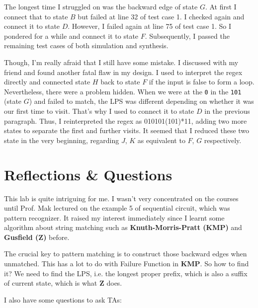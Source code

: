 \documentclass[12pt, a4paper]{article}
\begin{document}
The longest time I struggled on was the backward edge of state $G$. At first I connect that to state $B$ but failed at line 32 of test case 1. I checked again and connect it to state $D$. However, I failed again at line 75 of test case 1. So I pondered for a while and connect it to state $F$. Subsequently, I passed the remaining test cases of both simulation and synthesis.

Though, I'm really afraid that I still have some mistake. I discussed with my friend and found another fatal flaw in my design. I used to interpret the \textsf{regex} directly and connected state $H$ back to state $F$ if the input is \textsf{false} to form a loop. Nevertheless, there were a problem hidden. When we were at the \texttt{0} in the \texttt{101} (state $G$) and failed to match, the \textsf{LPS} was different depending on whether it was our first time to visit. That's why I used to connect it to state $D$ in the previous paragraph. Thus, I reinterpreted the \textsf{regex} as \textsf{010101(101)*11}, adding two more states to separate the first and further visits. It seemed that I reduced these two state in the very beginning, regarding $J$, $K$ as equivalent to $F$, $G$ respectively.


\section{Reflections \& Questions}

This lab is quite intriguing for me. I wasn't very concentrated on the courses until Prof. Mak lectured on the example 5 of sequential circuit, which was pattern recognizer. It raised my interest immediately since I learnt some algorithm about string matching such as \textbf{Knuth-Morris-Pratt (KMP)} and \textbf{Gusfield (Z)} before.

The crucial key to pattern matching is to construct those backward edges when unmatched. This has a lot to do with \textsf{Failure Function} in \textbf{KMP}. So how to find it? We need to find the \textsf{LPS}, i.e. the longest proper prefix, which is also a suffix of current state, which is what \textbf{Z} does.

I also have some questions to ask TAs:
\end{document}
